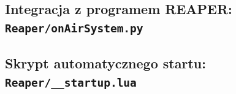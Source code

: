 \documentclass[11pt,a4paper]{article}
\begin{document}
\newpage
\subsection{Integracja z programem REAPER: \texttt{Reaper/onAirSystem.py}}


\newpage
\subsection{Skrypt automatycznego startu: \texttt{Reaper/\_\_startup.lua}}

\end{document}
